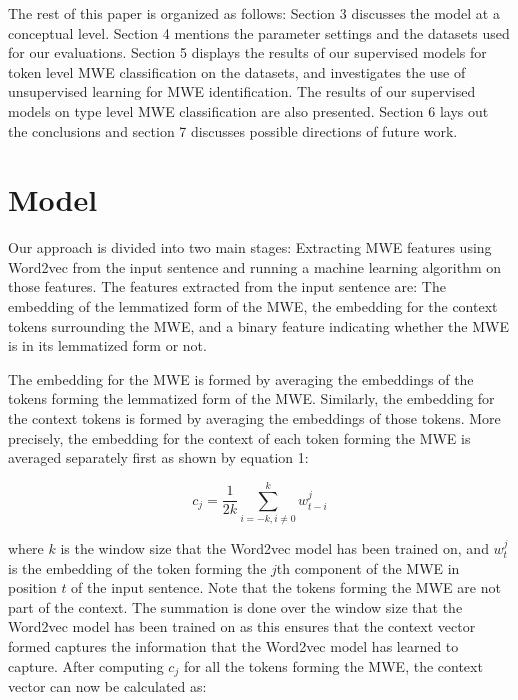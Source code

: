 \documentclass[11pt]{article}
\begin{document}
The rest of this paper is organized as follows: Section 3 discusses the model at a conceptual level. Section 4 mentions the parameter settings and the datasets used for our evaluations. Section 5 displays the results of our supervised models for token level MWE classification on the datasets, and investigates the use of unsupervised learning for MWE identification. The results of our supervised models on type level MWE classification are also presented. Section 6 lays out the conclusions and section 7 discusses possible directions of future work. 

\section{Model}

Our approach is divided into two main stages: Extracting MWE features using Word2vec from the input sentence and running a machine learning algorithm on those features. The features extracted from the input sentence are: The embedding of the lemmatized form of the MWE, the embedding for the context tokens surrounding the MWE, and a binary feature indicating whether the MWE is in its lemmatized form or not.

The embedding for the MWE is formed by averaging the embeddings of the tokens forming the lemmatized form of the MWE. Similarly, the embedding for the context tokens is formed by averaging the embeddings of those tokens. More precisely, the embedding for the context of each token forming the MWE is averaged separately first as shown by equation 1:

\begin{equation}
c_j = \frac{1}{2k} \sum_{i=-k, i \neq 0}^{k} w^j_{t-i}
\end{equation}


where $k$ is the window size that the Word2vec model has been trained on, and $w^j_t$ is the embedding of the token forming the $j$th component of the MWE in position $t$ of the input sentence. Note that the tokens forming the MWE are not part of the context. The summation is done over the window size that the Word2vec model has been trained on as this ensures that the context vector formed captures the information that the Word2vec model has learned to capture.  After computing $c_j$ for all the tokens forming the MWE, the context vector can now be calculated as:
\end{document}
